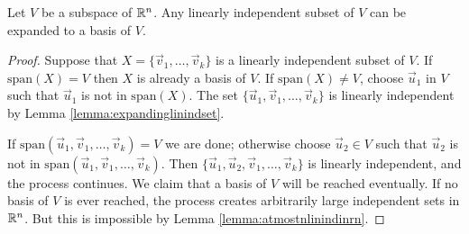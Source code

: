\documentclass{ximera}
\begin{document}
\begin{theorem}\label{th:expandtobasis}
Let $V$ be a subspace of $\mathbb{R}^n$.  Any linearly independent subset of $V$ can be expanded to a basis of $V$.
\end{theorem}
\begin{proof}
Suppose that $X=\{\vec{v}_1,\ldots ,\vec{v}_k\}$ is a linearly independent subset of $V$. If $\mbox{span}(X) = V$ then $X$ is already a basis of $V$. If $\mbox{span}(X) \neq V$, choose $\vec{u}_1$ in $V$ such that $\vec{u}_1$ is not in $\mbox{span}(X)$. The set $\{\vec{u}_1, \vec{v}_1,\ldots ,\vec{v}_k\}$ is linearly independent by Lemma \ref{lemma:expandinglinindset}. 

If $\mbox{span}(\vec{u}_1, \vec{v}_1,\ldots ,\vec{v}_k) = V$ we are done; otherwise choose $\vec{u}_{2} \in V$ such that $\vec{u}_{2}$ is not in $\mbox{span}(\vec{u}_1, \vec{v}_1,\ldots ,\vec{v}_k)$. Then $\{\vec{u}_1,\vec{u}_2, \vec{v}_1,\ldots ,\vec{v}_k\}$ is linearly independent, and the process continues. We claim that a basis of $V$ will be reached eventually. If no basis of $V$ is ever reached, the process creates arbitrarily large independent sets in $\mathbb{R}^n$. But this is impossible by Lemma \ref{lemma:atmostnlinindinrn}.
\end{proof}
\end{document}

